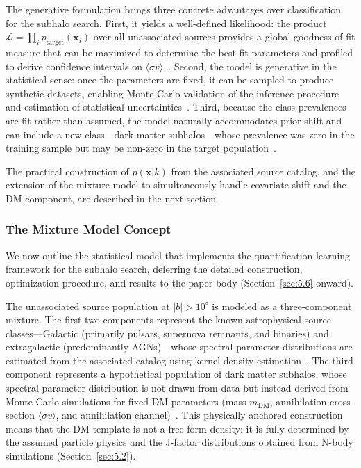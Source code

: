 The generative formulation brings three concrete advantages over classification for the subhalo search.
First, it yields a well-defined likelihood: the product $\mathcal{L} = \prod_i p_\mathrm{target}(\mathbf{x}_i)$ over all unassociated sources provides a global goodness-of-fit measure that can be maximized to determine the best-fit parameters and profiled to derive confidence intervals on $\langle\sigma v\rangle$~\cite{Amerio:2025fhz}.
Second, the model is generative in the statistical sense: once the parameters are fixed, it can be sampled to produce synthetic datasets, enabling Monte Carlo validation of the inference procedure and estimation of statistical uncertainties~\cite{Amerio:2025fhz}.
Third, because the class prevalences are fit rather than assumed, the model naturally accommodates prior shift and can include a new class---dark matter subhalos---whose prevalence was zero in the training sample but may be non-zero in the target population~\cite{Amerio:2025fhz, Saerens_2002}.

The practical construction of $p(\mathbf{x}|k)$ from the associated source catalog, and the extension of the mixture model to simultaneously handle covariate shift and the DM component, are described in the next section.

\subsubsection{The Mixture Model Concept}
\label{sec:5.5.4}

We now outline the statistical model that implements the quantification learning framework for the subhalo search, deferring the detailed construction, optimization procedure, and results to the paper body (Section~\ref{sec:5.6} onward).

The unassociated source population at $|b| > 10^\circ$ is modeled as a three-component mixture.
The first two components represent the known astrophysical source classes---Galactic (primarily pulsars, supernova remnants, and binaries) and extragalactic (predominantly AGNs)---whose spectral parameter distributions are estimated from the associated catalog using kernel density estimation~\cite{Amerio:2025fhz, Bishop:2006}.
The third component represents a hypothetical population of dark matter subhalos, whose spectral parameter distribution is not drawn from data but instead derived from Monte Carlo simulations for fixed DM parameters (mass $m_\mathrm{DM}$, annihilation cross-section $\langle\sigma v\rangle$, and annihilation channel)~\cite{Amerio:2025fhz}.
This physically anchored construction means that the DM template is not a free-form density: it is fully determined by the assumed particle physics and the J-factor distributions obtained from N-body simulations (Section~\ref{sec:5.2}).

